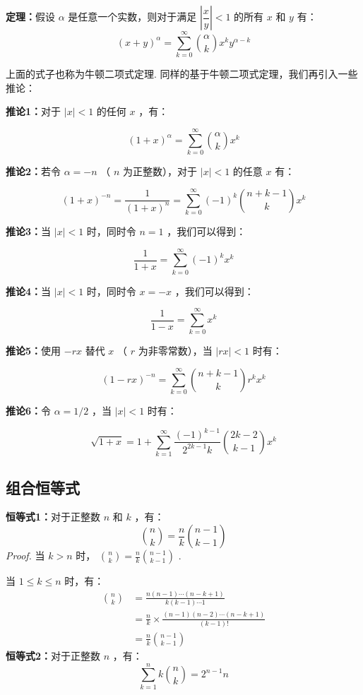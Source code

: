 \documentclass[cn, hazy, blue, normal, 12pt]{elegantnote}
\begin{document}
\textbf{定理：}假设 $ \alpha $ 是任意一个实数，则对于满足 $ |\dfrac{x}{y}|<1 $ 的所有 $ x $ 和 $ y $ 有：
$$
    (x+y)^{\alpha}=\sum_{k=0}^{\infty}\binom{\alpha}{k} x^k y^{\alpha-k}
$$

上面的式子也称为牛顿二项式定理. 同样的基于牛顿二项式定理，我们再引入一些推论：

\textbf{推论1：}对于 $ |x|<1 $ 的任何 $ x $ ，有：

$$
    (1+x)^{\alpha}=\sum_{k=0}^{\infty}\binom{\alpha}{k} x^k
$$

\textbf{推论2：}若令 $ \alpha=-n $ （ $ n $ 为正整数），对于 $ |x|<1 $ 的任意 $ x $ 有：

$$
    (1+x)^{-n}=\frac{1}{(1+x)^n}=\sum_{k=0}^{\infty}(-1)^k \binom{n+k-1}{k} x^k
$$

\textbf{推论3：}当 $ |x|<1 $ 时，同时令 $ n=1 $ ，我们可以得到：

$$
    \frac{1}{1+x}=\sum_{k=0}^\infty (-1)^k x^k
$$

\textbf{推论4：}当 $ |x|<1 $ 时，同时令 $ x=-x $ ，我们可以得到：

$$
    \frac{1}{1-x}=\sum_{k=0}^\infty x^k
$$

\textbf{推论5：}使用 $ -rx $ 替代 $ x $ （ $ r $ 为非零常数），当 $ |rx|<1 $ 时有：

$$
    (1-rx)^{-n}=\sum_{k=0}^\infty \binom{n+k-1}{k}r^kx^k
$$

\textbf{推论6：}令 $ \alpha=1/2 $ ，当 $ |x|<1 $ 时有：

$$
    \sqrt{1+x}=1+\sum_{k=1}^{\infty}\frac{(-1)^{k-1}}{2^{2k-1}k}\binom{2k-2}{k-1}x^k
$$

\subsection{组合恒等式}

\textbf{恒等式1：}对于正整数 $ n $ 和 $ k $ ，有：
$$
    \binom{n}{k}=\frac{n}{k}\binom{n-1}{k-1}
$$
\textit{Proof.} 当 $ k>n $ 时， $ \binom{n}{k}=\frac{n}{k}\binom{n-1}{k-1} $ .

当 $ 1\leq k\leq n $ 时，有：
$$
    \begin{aligned}
        \binom{n}{k} & =\frac{n(n-1)\cdots (n-k+1)}{k(k-1)\cdots 1}               \\
                     & =\frac{n}{k}\times \frac{(n-1)(n-2)\cdots (n-k+1)}{(k-1)!} \\
                     & =\frac{n}{k}\binom{n-1}{k-1}
    \end{aligned}
$$
\textbf{恒等式2：}对于正整数 $ n $ ，有：
$$
    \sum_{k=1}^n k\binom{n}{k}=2^{n-1} n
$$
\end{document}
